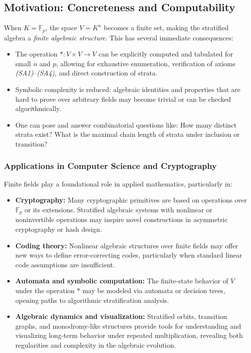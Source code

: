 \documentclass[12pt]{article}
\theoremstyle{definition}
\theoremstyle{plain}
\theoremstyle{remark}
\begin{document}
\subsection{Motivation: Concreteness and Computability}

When \( K = \mathbb{F}_p \), the space \( V = K^n \) becomes a finite set, making the stratified algebra a \emph{finite algebraic structure}. This has several immediate consequences:

\begin{itemize}
    \item The operation \( * : V \times V \to V \) can be explicitly computed and tabulated for small \( n \) and \( p \), allowing for exhaustive enumeration, verification of axioms \emph{(SA1)}–\emph{(SA4)}, and direct construction of strata.
    \item Symbolic complexity is reduced: algebraic identities and properties that are hard to prove over arbitrary fields may become trivial or can be checked algorithmically.
    \item One can pose and answer combinatorial questions like: How many distinct strata exist? What is the maximal chain length of strata under inclusion or transition?
\end{itemize}

\subsubsection{Applications in Computer Science and Cryptography}

Finite fields play a foundational role in applied mathematics, particularly in:

\begin{itemize}
    \item \textbf{Cryptography:} Many cryptographic primitives are based on operations over \( \mathbb{F}_p \) or its extensions. Stratified algebraic systems with nonlinear or noninvertible operations may inspire novel constructions in asymmetric cryptography or hash design.
    \item \textbf{Coding theory:} Nonlinear algebraic structures over finite fields may offer new ways to define error-correcting codes, particularly when standard linear code assumptions are insufficient.
    \item \textbf{Automata and symbolic computation:} The finite-state behavior of \( V \) under the operation \( * \) may be modeled via automata or decision trees, opening paths to algorithmic stratification analysis.
    \item \textbf{Algebraic dynamics and visualization:} Stratified orbits, transition graphs, and monodromy-like structures provide tools for understanding and visualizing long-term behavior under repeated multiplication, revealing both regularities and complexity in the algebraic evolution.
\end{itemize}
\end{document}
